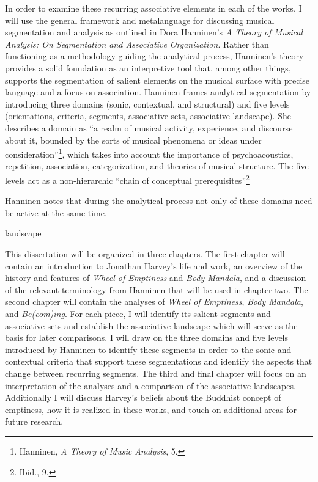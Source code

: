 In order to examine these recurring associative elements in each of the works, I will use the general framework and metalanguage for discussing musical segmentation and analysis as outlined in Dora Hanninen's \emph{A Theory of Musical Analysis: On Segmentation and Associative Organization}. Rather than functioning as a methodology guiding the analytical process, Hanninen's theory provides a solid foundation as an interpretive tool that, among other things, supports the segmentation of salient elements on the musical surface with precise language and a focus on association. Hanninen frames analytical segmentation by introducing three domains (sonic, contextual, and structural) and five levels (orientations, criteria, segments, associative sets, associative landscape). She describes a domain as ``a realm of musical activity, experience, and discourse about it, bounded by the sorts of musical phenomena or ideas under consideration''\footnote{Hanninen, \emph{A Theory of Music Analysis}, 5. }, which takes into account the importance of psychoacoustics, repetition, association, categorization, and theories of musical structure. The five levels act as a non-hierarchic ``chain of conceptual prerequisites''\footnote{Ibid., 9. }

Hanninen notes that during the analytical process not only of these domains need be active at the same time.

landscape

This dissertation will be organized in three chapters. The first chapter will contain an introduction to Jonathan Harvey's life and work, an overview of the history and features of \emph{Wheel of Emptiness} and \emph{Body Mandala}, and a discussion of the relevant terminology from Hanninen that will be used in chapter two. The second chapter will contain the analyses of \emph{Wheel of Emptiness}, \emph{Body Mandala}, and \emph{Be(com)ing}. For each piece, I will identify its salient segments and associative sets and establish the associative landscape which will serve as the basis for later comparisons. I will draw on the three domains and five levels introduced by Hanninen to identify these segments in order to the sonic and contextual criteria that support these segmentations and identify the aspects that change between recurring segments. The third and final chapter will focus on an interpretation of the analyses and a comparison of the associative landscapes. Additionally I will discuss Harvey's beliefs about the Buddhist concept of emptiness, how it is realized in these works, and touch on additional areas for future research.

